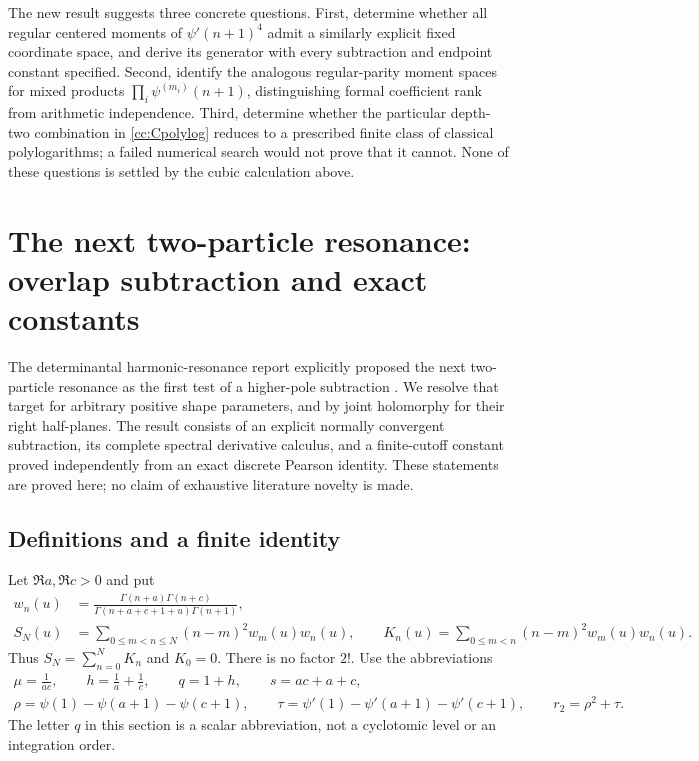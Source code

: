\documentclass[11pt,letterpaper]{article}
\theoremstyle{definition}
\theoremstyle{remark}
\numberwithin{equation}{section}
\begin{document}
The new result suggests three concrete questions.  First, determine
whether all regular centered moments of $\psi'(n+1)^4$ admit a
similarly explicit fixed coordinate space, and derive its generator
with every subtraction and endpoint constant specified.  Second,
identify the analogous regular-parity moment spaces for mixed products
$\prod_i\psi^{(m_i)}(n+1)$, distinguishing formal coefficient rank
from arithmetic independence.  Third, determine whether the particular
depth-two combination in \eqref{cc:Cpolylog} reduces to a prescribed
finite class of classical polylogarithms; a failed numerical search
would not prove that it cannot.  None of these questions is settled
by the cubic calculation above.



\section{The next two-particle resonance: overlap subtraction and exact constants}
\label{sec:second-resonance}

The determinantal harmonic-resonance report explicitly proposed the next
two-particle resonance as the first test of a higher-pole subtraction
\cite[Section~9]{incoming-determinantal}. We resolve that target for arbitrary positive
shape parameters, and by joint holomorphy for their right half-planes.
The result consists of an explicit normally convergent subtraction, its
complete spectral derivative calculus, and a finite-cutoff constant proved
independently from an exact discrete Pearson identity. These statements
are proved here; no claim of exhaustive literature novelty is made.

\subsection{Definitions and a finite identity}
Let $\Re a,\Re c>0$ and put
\begin{align}
 w_n(u)&=\frac{\Gamma(n+a)\Gamma(n+c)}
 {\Gamma(n+a+c+1+u)\Gamma(n+1)},\label{sr:eq:weight}\\
 S_N(u)&=\sum_{0\le m<n\le N}(n-m)^2w_m(u)w_n(u),\qquad
 K_n(u)=\sum_{0\le m<n}(n-m)^2w_m(u)w_n(u).
 \label{sr:eq:cutoff}
\end{align}
Thus $S_N=\sum_{n=0}^N K_n$ and $K_0=0$. There is no factor $2!$.
Use the abbreviations
\begin{gather}
 \mu=\frac1{ac},\qquad h=\frac1a+\frac1c,\qquad q=1+h,
 \qquad s=ac+a+c,\label{sr:eq:abbreviations}\\
 \rho=\psi(1)-\psi(a+1)-\psi(c+1),\qquad
 \tau=\psi'(1)-\psi'(a+1)-\psi'(c+1),\qquad r_2=\rho^2+\tau.
 \label{sr:eq:rho}
\end{gather}
The letter $q$ in this section is a scalar abbreviation, not a
cyclotomic level or an integration order.
\end{document}
